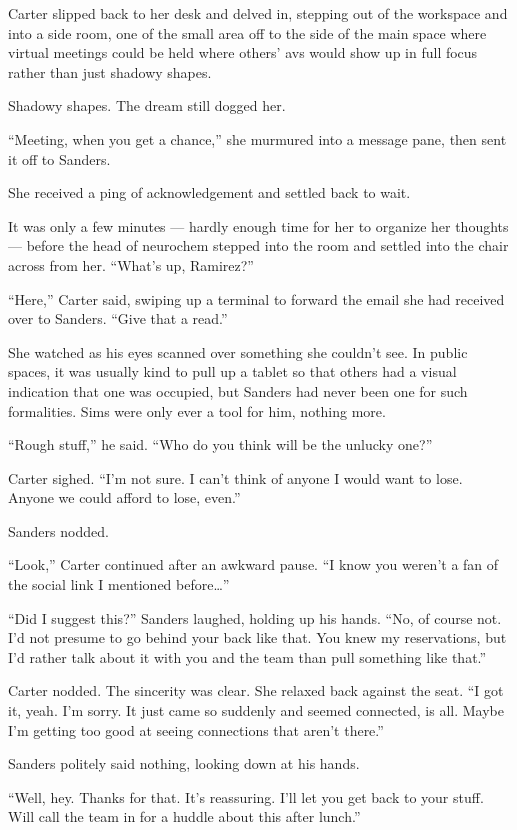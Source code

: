 Carter slipped back to her desk and delved in, stepping out of the workspace and into a side room, one of the small area off to the side of the main space where virtual meetings could be held where others' avs would show up in full focus rather than just shadowy shapes.

Shadowy shapes. The dream still dogged her.

``Meeting, when you get a chance,'' she murmured into a message pane, then sent it off to Sanders.

She received a ping of acknowledgement and settled back to wait.

It was only a few minutes — hardly enough time for her to organize her thoughts — before the head of neurochem stepped into the room and settled into the chair across from her. ``What's up, Ramirez?''

``Here,'' Carter said, swiping up a terminal to forward the email she had received over to Sanders. ``Give that a read.''

She watched as his eyes scanned over something she couldn't see. In public spaces, it was usually kind to pull up a tablet so that others had a visual indication that one was occupied, but Sanders had never been one for such formalities. Sims were only ever a tool for him, nothing more.

``Rough stuff,'' he said. ``Who do you think will be the unlucky one?''

Carter sighed. ``I'm not sure. I can't think of anyone I would want to lose. Anyone we could afford to lose, even.''

Sanders nodded.

``Look,'' Carter continued after an awkward pause. ``I know you weren't a fan of the social link I mentioned before\ldots{}''

``Did I suggest this?'' Sanders laughed, holding up his hands. ``No, of course not. I'd not presume to go behind your back like that. You knew my reservations, but I'd rather talk about it with you and the team than pull something like that.''

Carter nodded. The sincerity was clear. She relaxed back against the seat. ``I got it, yeah. I'm sorry. It just came so suddenly and seemed connected, is all. Maybe I'm getting too good at seeing connections that aren't there.''

Sanders politely said nothing, looking down at his hands.

``Well, hey. Thanks for that. It's reassuring. I'll let you get back to your stuff. Will call the team in for a huddle about this after lunch.''

